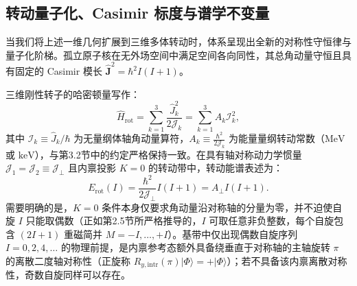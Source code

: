 \subsection{转动量子化、Casimir 标度与谱学不变量}\label{sec:3-1-2}

当我们将上述一维几何扩展到三维多体转动时，体系呈现出全新的对称性守恒律与量子化阶梯。孤立原子核在无外场空间中满足空间各向同性，其总角动量守恒且具有固定的 Casimir 模长 $\hat{\mathbf{J}}^2 = \hbar^2 I(I+1)$。

三维刚性转子的哈密顿量写作：
\begin{equation}\label{eq:3-1-rot-H}
\hat{H}_{\text{rot}} = \sum_{k=1}^3 \frac{\hat{J}_k^2}{2\mathcal{J}_k} = \sum_{k=1}^3 A_k \mathcal{I}_k^2,
\end{equation}
其中 $\mathcal{I}_k \equiv \hat{J}_k / \hbar$ 为无量纲体轴角动量算符，$A_k \equiv \frac{\hbar^2}{2\mathcal{J}_k}$ 为能量量纲转动常数（$\mathrm{MeV}$ 或 $\mathrm{keV}$），与第3.2节中的约定严格保持一致。在具有轴对称动力学惯量 $\mathcal{J}_1 = \mathcal{J}_2 \equiv \mathcal{J}_\perp$ 且内禀投影 $K=0$ 的转动带中，转动能谱表述为：
\begin{equation}\label{eq:3-1-rot-spectrum}
E_{\text{rot}}(I) = \frac{\hbar^2}{2\mathcal{J}_\perp} I(I+1) = A_\perp I(I+1).
\end{equation}
需要明确的是，$K=0$ 条件本身仅要求角动量沿对称轴的分量为零，并不迫使自旋 $I$ 只能取偶数（正如第2.5节所严格推导的，$I$ 可取任意非负整数，每个自旋包含 $(2I+1)$ 重磁简并 $M = -I, \dots, +I$）。基带中仅出现偶数自旋序列 $I = 0, 2, 4, \dots$ 的物理前提，是内禀参考态额外具备绕垂直于对称轴的主轴旋转 $\pi$ 的离散二度轴对称性（正旋称 $R_{y, \text{intr}}(\pi) |\Phi\rangle = + |\Phi\rangle$）；若不具备该内禀离散对称性，奇数自旋同样可以存在。


